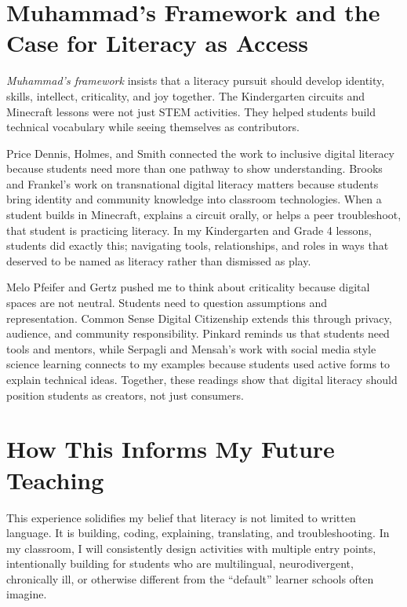 \documentclass[11pt]{article}
\begin{document}
\section*{Muhammad's Framework and the Case for Literacy as Access}

\textit{Muhammad's framework} insists that a literacy pursuit should develop identity, skills, intellect, criticality, and joy together. The Kindergarten circuits and Minecraft lessons were not just STEM activities. They helped students build technical vocabulary while seeing themselves as contributors.

Price Dennis, Holmes, and Smith connected the work to inclusive digital literacy because students need more than one pathway to show understanding. Brooks and Frankel's work on transnational digital literacy matters because students bring identity and community knowledge into classroom technologies. When a student builds in Minecraft, explains a circuit orally, or helps a peer troubleshoot, that student is practicing literacy. In my Kindergarten and Grade 4 lessons, students did exactly this; navigating tools, relationships, and roles in ways that deserved to be named as literacy rather than dismissed as play.

\newpage
Melo Pfeifer and Gertz pushed me to think about criticality because digital spaces are not neutral. Students need to question assumptions and representation. Common Sense Digital Citizenship extends this through privacy, audience, and community responsibility. Pinkard reminds us that students need tools and mentors, while Serpagli and Mensah's work with social media style science learning connects to my examples because students used active forms to explain technical ideas. Together, these readings show that digital literacy should position students as creators, not just consumers.

\section*{How This Informs My Future Teaching}

This experience solidifies my belief that literacy is not limited to written language. It is building, coding, explaining, translating, and troubleshooting. In my classroom, I will consistently design activities with multiple entry points, intentionally building for students who are multilingual, neurodivergent, chronically ill, or otherwise different from the ``default'' learner schools often imagine.
\end{document}
